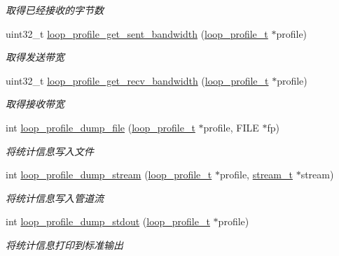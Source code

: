 \begin{DoxyCompactItemize}
\begin{DoxyCompactList}\small\item\em 取得已经接收的字节数 \end{DoxyCompactList}\item 
uint32\+\_\+t \hyperlink{a00077_a05b508d71cdd8841e352657afa86b919_a05b508d71cdd8841e352657afa86b919}{loop\+\_\+profile\+\_\+get\+\_\+sent\+\_\+bandwidth} (\hyperlink{a00050_ad060e1396346d2f5db1ec0597376a107_ad060e1396346d2f5db1ec0597376a107}{loop\+\_\+profile\+\_\+t} $\ast$profile)
\begin{DoxyCompactList}\small\item\em 取得发送带宽 \end{DoxyCompactList}\item 
uint32\+\_\+t \hyperlink{a00077_aa14aa9382129b3c7facf5160ab7b1f7c_aa14aa9382129b3c7facf5160ab7b1f7c}{loop\+\_\+profile\+\_\+get\+\_\+recv\+\_\+bandwidth} (\hyperlink{a00050_ad060e1396346d2f5db1ec0597376a107_ad060e1396346d2f5db1ec0597376a107}{loop\+\_\+profile\+\_\+t} $\ast$profile)
\begin{DoxyCompactList}\small\item\em 取得接收带宽 \end{DoxyCompactList}\item 
int \hyperlink{a00077_ab1f417c556537e763c3b06e9129740a6_ab1f417c556537e763c3b06e9129740a6}{loop\+\_\+profile\+\_\+dump\+\_\+file} (\hyperlink{a00050_ad060e1396346d2f5db1ec0597376a107_ad060e1396346d2f5db1ec0597376a107}{loop\+\_\+profile\+\_\+t} $\ast$profile, F\+I\+L\+E $\ast$fp)
\begin{DoxyCompactList}\small\item\em 将统计信息写入文件 \end{DoxyCompactList}\item 
int \hyperlink{a00077_a8fdc6b3f9949a392d5158ca4b6120bc1_a8fdc6b3f9949a392d5158ca4b6120bc1}{loop\+\_\+profile\+\_\+dump\+\_\+stream} (\hyperlink{a00050_ad060e1396346d2f5db1ec0597376a107_ad060e1396346d2f5db1ec0597376a107}{loop\+\_\+profile\+\_\+t} $\ast$profile, \hyperlink{a00050_a261dba04f46f5c59a68a05f69f5a65a8_a261dba04f46f5c59a68a05f69f5a65a8}{stream\+\_\+t} $\ast$stream)
\begin{DoxyCompactList}\small\item\em 将统计信息写入管道流 \end{DoxyCompactList}\item 
int \hyperlink{a00077_a8053f8ce58d9a9ecb90db0696a427851_a8053f8ce58d9a9ecb90db0696a427851}{loop\+\_\+profile\+\_\+dump\+\_\+stdout} (\hyperlink{a00050_ad060e1396346d2f5db1ec0597376a107_ad060e1396346d2f5db1ec0597376a107}{loop\+\_\+profile\+\_\+t} $\ast$profile)
\begin{DoxyCompactList}\small\item\em 将统计信息打印到标准输出 \end{DoxyCompactList}\end{DoxyCompactItemize}


